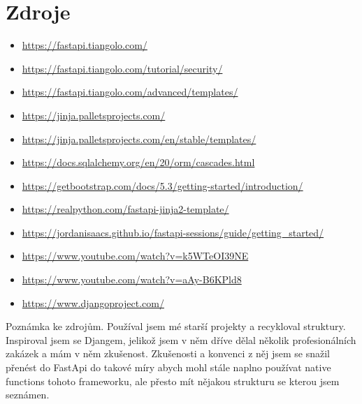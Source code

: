 \documentclass[a4paper,12pt]{article}
\begin{document}
\section*{Zdroje}
\begin{itemize}
    \item \url{https://fastapi.tiangolo.com/}
    \item \url{https://fastapi.tiangolo.com/tutorial/security/}
    \item \url{https://fastapi.tiangolo.com/advanced/templates/}
    \item \url{https://jinja.palletsprojects.com/}
    \item \url{https://jinja.palletsprojects.com/en/stable/templates/}
    \item \url{https://docs.sqlalchemy.org/en/20/orm/cascades.html}
    \item \url{https://getbootstrap.com/docs/5.3/getting-started/introduction/}
    \item \url{https://realpython.com/fastapi-jinja2-template/}
    \item \url{https://jordanisaacs.github.io/fastapi-sessions/guide/getting_started/}
    \item \url{https://www.youtube.com/watch?v=k5WTeOI39NE}
    \item \url{https://www.youtube.com/watch?v=aAy-B6KPld8}
    \item \url{https://www.djangoproject.com/}
\end{itemize}


Poznámka ke zdrojům. Používal jsem mé starší projekty a recykloval struktury. Inspiroval jsem se Djangem, jelikož jsem v něm dříve dělal několik profesionálních zakázek a mám v něm zkušenost. Zkušenosti a konvenci z něj jsem se snažil přenést do FastApi do takové míry abych mohl stále naplno používat native functions tohoto frameworku, ale přesto mít nějakou strukturu se kterou jsem seznámen. 
\end{document}

